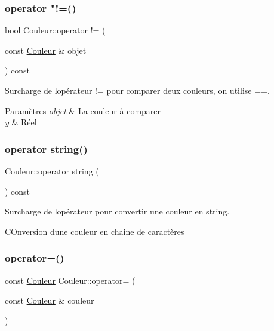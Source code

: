 \subsubsection{\texorpdfstring{operator "!=()}{operator !=()}}
{\footnotesize\ttfamily bool Couleur\+::operator != (\begin{DoxyParamCaption}\item[{const \mbox{\hyperlink{class_couleur}{Couleur}} \&}]{objet }\end{DoxyParamCaption}) const}



Surcharge de l\textquotesingle{}opérateur != pour comparer deux couleurs, on utilise ==. 


\begin{DoxyParams}{Paramètres}
{\em objet} & La couleur à comparer \\
\hline
{\em y} & Réel \\
\hline
\end{DoxyParams}
\mbox{\label{class_couleur_acff55563e5760e4cea32ca275eb62205}} 
\subsubsection{\texorpdfstring{operator string()}{operator string()}}
{\footnotesize\ttfamily Couleur\+::operator string (\begin{DoxyParamCaption}{ }\end{DoxyParamCaption}) const}



Surcharge de l\textquotesingle{}opérateur pour convertir une couleur en string. 

C\+Onversion d\textquotesingle{}une couleur en chaine de caractères \mbox{\label{class_couleur_af49bf608ba98af5f9dfe19fbe2759000}} 
\subsubsection{\texorpdfstring{operator=()}{operator=()}}
{\footnotesize\ttfamily const \mbox{\hyperlink{class_couleur}{Couleur}} Couleur\+::operator= (\begin{DoxyParamCaption}\item[{const \mbox{\hyperlink{class_couleur}{Couleur}} \&}]{couleur }\end{DoxyParamCaption})}



